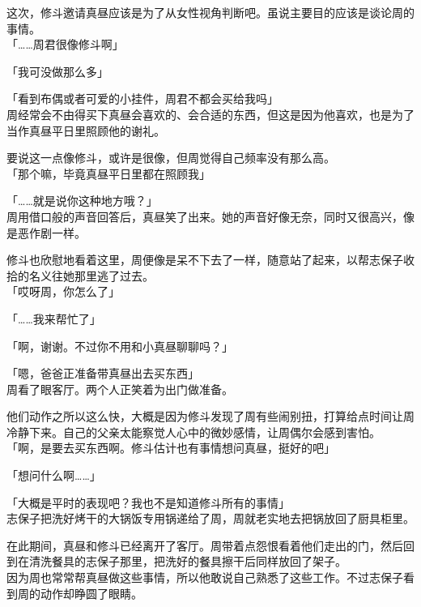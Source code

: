 这次，修斗邀请真昼应该是为了从女性视角判断吧。虽说主要目的应该是谈论周的事情。\\

「……周君很像修斗啊」

「我可没做那么多」

「看到布偶或者可爱的小挂件，周君不都会买给我吗」\\

周经常会不由得买下真昼会喜欢的、会合适的东西，但这是因为他喜欢，也是为了当作真昼平日里照顾他的谢礼。

要说这一点像修斗，或许是很像，但周觉得自己频率没有那么高。\\

「那个嘛，毕竟真昼平日里都在照顾我」

「……就是说你这种地方哦？」\\

周用借口般的声音回答后，真昼笑了出来。她的声音好像无奈，同时又很高兴，像是恶作剧一样。

修斗也欣慰地看着这里，周便像是呆不下去了一样，随意站了起来，以帮志保子收拾的名义往她那里逃了过去。\\

「哎呀周，你怎么了」

「……我来帮忙了」

「啊，谢谢。不过你不用和小真昼聊聊吗？」

「嗯，爸爸正准备带真昼出去买东西」\\

周看了眼客厅。两个人正笑着为出门做准备。

他们动作之所以这么快，大概是因为修斗发现了周有些闹别扭，打算给点时间让周冷静下来。自己的父亲太能察觉人心中的微妙感情，让周偶尔会感到害怕。\\

「啊，是要去买东西啊。修斗估计也有事情想问真昼，挺好的吧」

「想问什么啊……」

「大概是平时的表现吧？我也不是知道修斗所有的事情」\\

志保子把洗好烤干的大锅饭专用锅递给了周，周就老实地去把锅放回了厨具柜里。

在此期间，真昼和修斗已经离开了客厅。周带着点怨恨看着他们走出的门，然后回到在清洗餐具的志保子那里，把洗好的餐具擦干后同样放回了架子。\\

因为周也常常帮真昼做这些事情，所以他敢说自己熟悉了这些工作。不过志保子看到周的动作却睁圆了眼睛。\\

